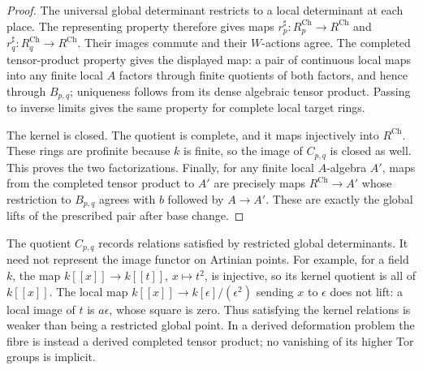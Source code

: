 \begin{proof}
The universal global determinant restricts to a local determinant
at each place. The representing property therefore gives maps
$r_p^{\sharp}:R_p^{\mathrm{Ch}}\to R^{\mathrm{Ch}}$ and
$r_q^{\sharp}:R_q^{\mathrm{Ch}}\to R^{\mathrm{Ch}}$.
Their images commute and their $W$-actions agree. The completed
tensor-product property gives the displayed map: a pair of
continuous local maps into any finite local $A$ factors through
finite quotients of both factors, and hence through $B_{p,q}$;
uniqueness follows from its dense algebraic tensor product.
Passing to inverse limits gives the same property for complete
local target rings.

The kernel is closed. The quotient is complete, and it maps
injectively into $R^{\mathrm{Ch}}$. These rings are profinite
because $k$ is finite, so the image of $C_{p,q}$ is closed as
well. This proves the two factorizations. Finally, for any finite
local $A$-algebra $A'$, maps from the completed tensor product to
$A'$ are precisely maps $R^{\mathrm{Ch}}\to A'$ whose restriction
to $B_{p,q}$ agrees with $b$ followed by $A\to A'$. These are
exactly the global lifts of the prescribed pair after base change.
\end{proof}

The quotient $C_{p,q}$ records relations satisfied by restricted
global determinants. It need not represent the image functor on
Artinian points. For example, for a field $k$, the map
$k[[x]]\to k[[t]]$, $x\mapsto t^2$, is injective, so its kernel
quotient is all of $k[[x]]$. The local map
$k[[x]]\to k[\epsilon]/(\epsilon^2)$ sending $x$ to $\epsilon$
does not lift: a local image of $t$ is $a\epsilon$, whose square
is zero. Thus satisfying the kernel relations is weaker than
being a restricted global point. In a derived deformation problem
the fibre is instead a derived completed tensor product; no
vanishing of its higher Tor groups is implicit.


